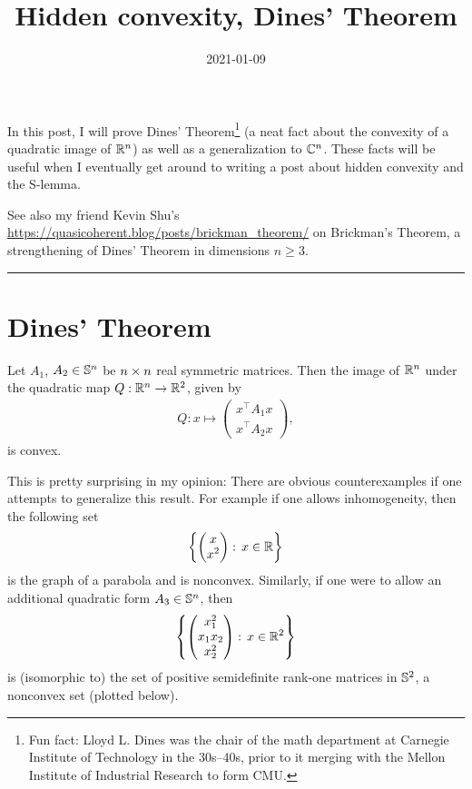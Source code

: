 \documentclass{article}
\title{Hidden convexity, Dines' Theorem}
\date{2021-01-09}
\begin{document}
In this post, I will prove Dines' Theorem\footnote{Fun fact: Lloyd L. Dines was the chair of the math department at Carnegie Institute of Technology in the 30s--40s, prior to it merging with the Mellon Institute of Industrial Research to form CMU.} (a neat fact about the convexity of a quadratic image of $\R^n$) as well as a generalization to $\C^n$. These facts will be useful when I eventually get around to writing a post about hidden convexity and the S-lemma.

See also my friend Kevin Shu's \href{post}{https://quasicoherent.blog/posts/brickman_theorem/} on Brickman's Theorem, a strengthening of Dines' Theorem in dimensions $n \geq 3$.

\rule{0.5\linewidth}{\linethickness}

\section{Dines' Theorem}
\begin{theorem}
Let $A_1$, $A_2\in\S^n$ be $n\by n$ real symmetric matrices. Then the image of $\R^n$ under the quadratic map $Q:\R^n\to\R^2$, given by
\begin{align*}
Q:x\mapsto \begin{pmatrix}
	x^\intercal A_1 x\\
	x^\intercal A_2 x
\end{pmatrix},
\end{align*}
is convex. 
\end{theorem}
This is pretty surprising in my opinion: There are obvious counterexamples if one attempts to generalize this result. For example if one allows inhomogeneity, then the following set
\begin{align*}
\set{\begin{pmatrix}
	x\\
	x^2
\end{pmatrix}:\, x\in\R}
\end{align*}
is the graph of a parabola and is nonconvex. Similarly, if one were to allow an additional quadratic form $A_3\in\S^n$, then
\begin{align*}
\set{\begin{pmatrix}
	x_1^2\\
	x_1x_2\\
	x_2^2
\end{pmatrix}:\, x\in\R^2}
\end{align*}
is (isomorphic to) the set of positive semidefinite rank-one matrices in $\S^2$, a nonconvex set (plotted below).
\end{document}
